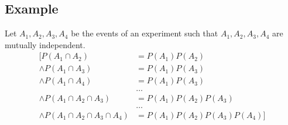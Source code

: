 \documentclass[letterpaper, 12pt]{math}
\begin{document}
\subsection*{Example}
Let \( A_{1}, A_{2}, A_{3}, A_{4} \) be the events of an experiment such that
\( A_{1}, A_{2}, A_{3}, A_{4} \) are mutually independent.
\begin{align*}
  \bigg[P(A_{1} \cap A_{2}) &= P(A_{1})P(A_{2}) \\
  \wedge P(A_{1} \cap A_{3}) &= P(A_{1})P(A_{3}) \\
  \wedge P(A_{1} \cap A_{4}) &= P(A_{1})P(A_{3}) \\
  & \dots \\
  \wedge P(A_{1} \cap A_{2} \cap A_{3}) &= P(A_{1})P(A_{2})P(A_{3}) \\
  & \dots \\
  \wedge P(A_{1} \cap A_{2} \cap A_{3} \cap A_{4}) &=
    P(A_{1})P(A_{2})P(A_{3})P(A_{4}) \bigg]
\end{align*}
\end{document}
